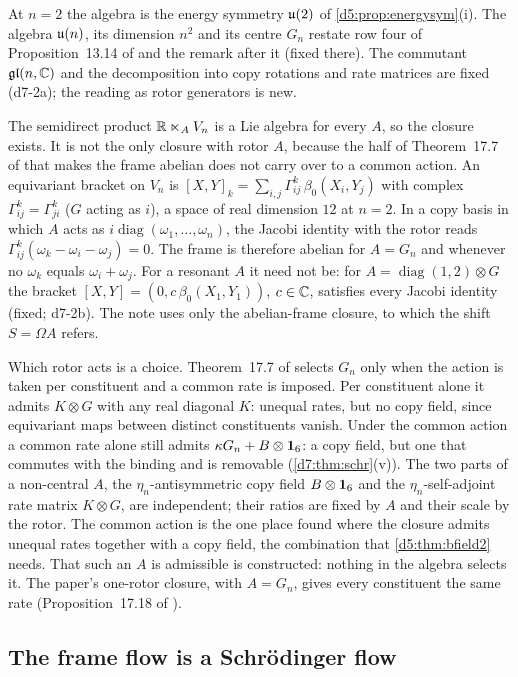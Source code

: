 At $n=2$ the algebra is the energy symmetry $\mathfrak{u}(2)$ of \cref{d5:prop:energysym}(i). The algebra $\mathfrak{u}(n)$, its dimension $n^2$ and its centre $G_n$
restate row four of Proposition~13.14 of \cite{ES17} and the remark after it (fixed there). The commutant $\mathfrak{gl}(n,\mathbb{C})$ and the
decomposition into copy rotations and rate matrices are fixed (d7-2a); the reading as rotor generators is new.

The semidirect product $\mathbb{R}\ltimes_AV_n$ is a Lie algebra for every $A$, so the closure exists. It is not the only closure with rotor $A$, because
the half of Theorem~17.7 of \cite{ES17} that makes the frame abelian does not carry over to a common action. An equivariant bracket on $V_n$ is
$[X,Y]_k=\sum_{i,j}\Gamma^k_{ij}\,\beta_0(X_i,Y_j)$ with complex $\Gamma^k_{ij}=\Gamma^k_{ji}$ ($G$ acting as $i$), a space of real dimension $12$ at $n=2$. In a
copy basis in which $A$ acts as $i\operatorname{diag}(\omega_1,\dots,\omega_n)$, the Jacobi identity with the rotor reads $\Gamma^k_{ij}(\omega_k-\omega_i-\omega_j)=0$. The
frame is therefore abelian for $A=G_n$ and whenever no $\omega_k$ equals $\omega_i+\omega_j$. For a resonant $A$ it need not be: for
$A=\operatorname{diag}(1,2)\otimes G$ the bracket $[X,Y]=(0,c\,\beta_0(X_1,Y_1))$, $c\in\mathbb{C}$, satisfies every Jacobi identity (fixed; d7-2b). The note uses
only the abelian-frame closure, to which the shift $S=\Omega A$ refers.

Which rotor acts is a choice. Theorem~17.7 of \cite{ES17} selects $G_n$ only when the action is taken per constituent and a common rate is
imposed. Per constituent alone it admits $K\otimes G$ with any real diagonal $K$: unequal rates, but no copy field, since equivariant maps between
distinct constituents vanish. Under the common action a common rate alone still admits $\kappa G_n+B\otimes\mathbf 1_6$: a copy field, but one that commutes
with the binding and is removable (\cref{d7:thm:schr}(v)). The two parts of a non-central $A$, the $\eta_n$-antisymmetric copy field
$B\otimes\mathbf 1_6$ and the $\eta_n$-self-adjoint rate matrix $K\otimes G$, are independent; their ratios are fixed by $A$ and their scale by the rotor.
The common action is the one place found where the closure admits unequal rates together with a copy field, the combination that
\cref{d5:thm:bfield2} needs. That such an $A$ is admissible is constructed: nothing in the algebra selects it. The paper's one-rotor closure, with
$A=G_n$, gives every constituent the same rate (Proposition~17.18 of \cite{ES17}).

\subsection{The frame flow is a Schr\"odinger flow}
\label{d7:sec:schr}

